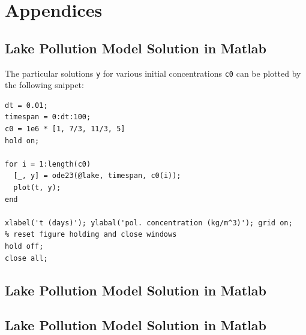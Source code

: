 \documentclass[a4paper]{article}
\begin{document}


\newpage



\newpage
\appendix

\section{Appendices}

\newpage
\subsection{Lake Pollution Model Solution in Matlab}
\label{app:code_lake_pollution}


The particular solutions \texttt{y} for various initial concentrations \texttt{c0} can be plotted by the following snippet:
\begin{verbatim}
dt = 0.01;
timespan = 0:dt:100;
c0 = 1e6 * [1, 7/3, 11/3, 5]
hold on;

for i = 1:length(c0)
  [_, y] = ode23(@lake, timespan, c0(i));
  plot(t, y);
end

xlabel('t (days)'); ylabal('pol. concentration (kg/m^3)'); grid on;
% reset figure holding and close windows
hold off;
close all;
\end{verbatim}



\newpage
\subsection{Lake Pollution Model Solution in Matlab}
\label{app:code_slope_field}




\newpage
\subsection{Lake Pollution Model Solution in Matlab}
\label{app:code_eulers_method}


\end{document}
